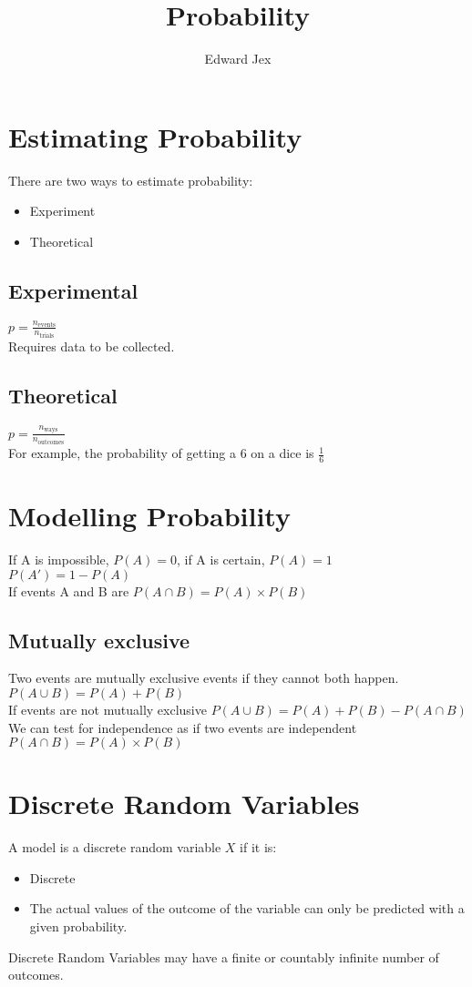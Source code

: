 \documentclass[a4paper,12pt]{article}
\begin{document}
\title{Probability}	
\author{Edward Jex}
\maketitle
\section*{Estimating Probability}
There are two ways to estimate probability:
\begin{itemize}
	\item Experiment
	\item Theoretical
\end{itemize}
\subsection*{Experimental}
$p = \frac{n_{\text{events}}}{n_{\text{trials}}}$ \\
Requires data to be collected. \\
\subsection*{Theoretical}
$p = \frac{n_{\text{ways}}}{n_{\text{outcomes}}}$ \\
For example, the probability of getting a 6 on a dice is $\frac{1}{6}$\\

\section*{Modelling Probability}
If A is impossible, $P(A) = 0$, if A is certain, $P(A) = 1$ \\
$P(A') = 1 - P(A)$ \\
If events A and B are  $P(A \cap B) = P(A) \times P(B)$ 
\subsection*{Mutually exclusive}
Two events are mutually exclusive events if they cannot both happen. \\
$P(A \cup B) = P(A) + P(B)$ \\

If events are not mutually exclusive $P(A \cup B) = P(A) + P(B) - P(A \cap B)$ \\
We can test for independence as if two events are independent $P(A \cap B) = P(A) \times P(B)$

\section*{Discrete Random Variables}
A model is a discrete random variable $X$ if it is:
\begin{itemize}
	\item Discrete
	\item The actual values of the outcome of the variable can only be predicted with a given probability.
\end{itemize}
Discrete Random Variables may have a finite or countably infinite number of outcomes.\\
\end{document}
